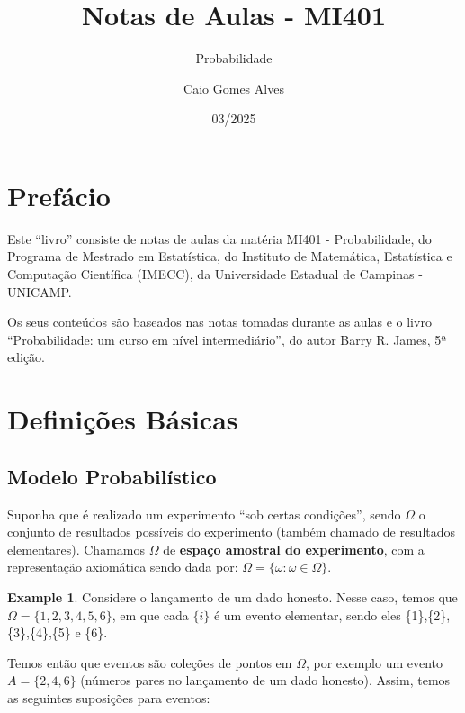 \documentclass[
]{article}
\title{Notas de Aulas - MI401}
\subtitle{Probabilidade}
\author{Caio Gomes Alves}
\date{03/2025}
\theoremstyle{definition}
\theoremstyle{definition}
\newtheorem{example}{Example}[section]
\theoremstyle{definition}
\theoremstyle{definition}
\theoremstyle{remark}
\begin{document}
\maketitle

\renewcommand*\contentsname{Conteúdos}
{
\setcounter{tocdepth}{2}
\tableofcontents
}
\newpage

\hypertarget{prefuxe1cio}{%
\section{Prefácio}\label{prefuxe1cio}}

Este ``livro'' consiste de notas de aulas da matéria MI401 - Probabilidade, do Programa de Mestrado em Estatística, do Instituto de Matemática, Estatística e Computação Científica (IMECC), da Universidade Estadual de Campinas - UNICAMP.

Os seus conteúdos são baseados nas notas tomadas durante as aulas e o livro ``Probabilidade: um curso em nível intermediário'', do autor Barry R. James, 5ª edição.

\newpage

\hypertarget{definiuxe7uxf5es-buxe1sicas}{%
\section{Definições Básicas}\label{definiuxe7uxf5es-buxe1sicas}}

\hypertarget{modelo-probabiluxedstico}{%
\subsection{Modelo Probabilístico}\label{modelo-probabiluxedstico}}

Suponha que é realizado um experimento ``sob certas condições'', sendo \textbf{\(\Omega\)} o conjunto de resultados possíveis do experimento (também chamado de resultados elementares). Chamamos \textbf{\(\Omega\)} de \textbf{espaço amostral do experimento}, com a representação axiomática sendo dada por: \(\Omega = \{\omega : \omega \in \Omega\}\).

\begin{example}
Considere o lançamento de um dado honesto. Nesse caso, temos que \(\Omega = \{1,2,3,4,5,6\}\), em que cada \(\{i\}\) é um evento elementar, sendo eles \{1\},\{2\},\{3\},\{4\},\{5\} e \{6\}.
\end{example}

Temos então que eventos são coleções de pontos em \(\Omega\), por exemplo um evento \(A = \{2,4,6\}\) (números pares no lançamento de um dado honesto). Assim, temos as seguintes suposições para eventos:
\end{document}
